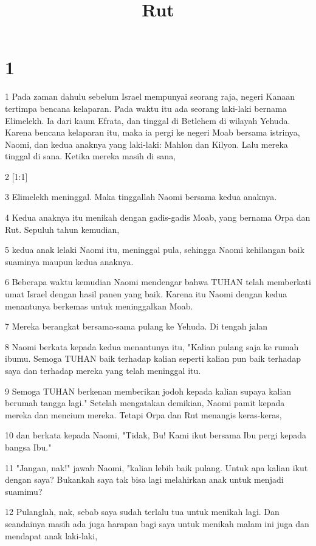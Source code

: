 

\title{Rut}


\chapter{1}

\par 1 Pada zaman dahulu sebelum Israel mempunyai seorang raja, negeri Kanaan tertimpa bencana kelaparan. Pada waktu itu ada seorang laki-laki bernama Elimelekh. Ia dari kaum Efrata, dan tinggal di Betlehem di wilayah Yehuda. Karena bencana kelaparan itu, maka ia pergi ke negeri Moab bersama istrinya, Naomi, dan kedua anaknya yang laki-laki: Mahlon dan Kilyon. Lalu mereka tinggal di sana. Ketika mereka masih di sana,
\par 2 [1:1]
\par 3 Elimelekh meninggal. Maka tinggallah Naomi bersama kedua anaknya.
\par 4 Kedua anaknya itu menikah dengan gadis-gadis Moab, yang bernama Orpa dan Rut. Sepuluh tahun kemudian,
\par 5 kedua anak lelaki Naomi itu, meninggal pula, sehingga Naomi kehilangan baik suaminya maupun kedua anaknya.
\par 6 Beberapa waktu kemudian Naomi mendengar bahwa TUHAN telah memberkati umat Israel dengan hasil panen yang baik. Karena itu Naomi dengan kedua menantunya berkemas untuk meninggalkan Moab.
\par 7 Mereka berangkat bersama-sama pulang ke Yehuda. Di tengah jalan
\par 8 Naomi berkata kepada kedua menantunya itu, "Kalian pulang saja ke rumah ibumu. Semoga TUHAN baik terhadap kalian seperti kalian pun baik terhadap saya dan terhadap mereka yang telah meninggal itu.
\par 9 Semoga TUHAN berkenan memberikan jodoh kepada kalian supaya kalian berumah tangga lagi." Setelah mengatakan demikian, Naomi pamit kepada mereka dan mencium mereka. Tetapi Orpa dan Rut menangis keras-keras,
\par 10 dan berkata kepada Naomi, "Tidak, Bu! Kami ikut bersama Ibu pergi kepada bangsa Ibu."
\par 11 "Jangan, nak!" jawab Naomi, "kalian lebih baik pulang. Untuk apa kalian ikut dengan saya? Bukankah saya tak bisa lagi melahirkan anak untuk menjadi suamimu?
\par 12 Pulanglah, nak, sebab saya sudah terlalu tua untuk menikah lagi. Dan seandainya masih ada juga harapan bagi saya untuk menikah malam ini juga dan mendapat anak laki-laki,
